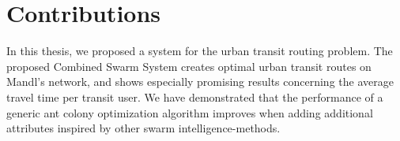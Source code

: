\section{Contributions}


%

In this thesis, we proposed a system for the urban transit routing problem. The proposed Combined Swarm System creates optimal urban transit routes on Mandl's network\citep{mandl79}, and shows especially promising results concerning the average travel time per transit user. We have demonstrated that the performance of a generic ant colony optimization algorithm improves when adding additional attributes inspired by other swarm intelligence-methods. %



